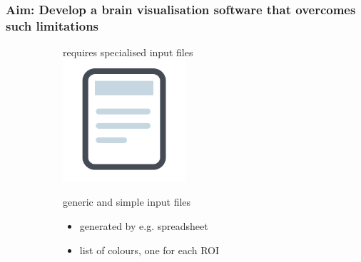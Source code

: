 \documentclass[10pt,xcolor=table,aspectratio=169]{beamer}
\newcommand{\xmark}{\ding{55}}%
\begin{document}
\begin{frame}[t]
 \frametitle{Aim: Develop a brain visualisation software that overcomes such limitations}


 
\newcommand{\myyes}{\textcolor{green1}{\Large{\textbf{\checkmark}}}}
\newcommand{\myno}{\textcolor{red1}{\Large{\xmark}}}

\begin{figure}
\centering
\begin{subfigure}[t]{0.3\textwidth}
\centering
 \begin{minipage}[t][3.5cm][t]{\textwidth}
 \centering
\myno requires specialised input files\\
\includegraphics[width=0.5\textwidth]{images/inputFile} 
 \end{minipage}


\myyes generic and simple input files

\begin{itemize}
 \item generated by e.g. spreadsheet
 \item list of colours, one for each ROI
\end{itemize}




\end{subfigure}
\end{figure}
\end{frame}
\end{document}
